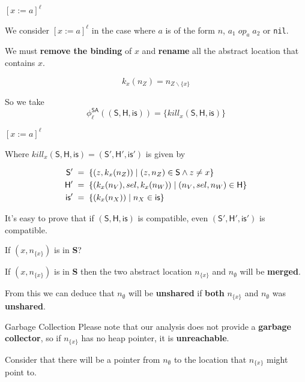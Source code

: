 \documentclass[xcolor=svgnames,11pt]{beamer}
\begin{document}
\begin{frame}{$[x:=a]^\ell$}

\begin{block}{}
We consider $[x:=a]^\ell$ in the case where $a$ is of the form $n$, $a_1 \; op_a \; a_2$ or \texttt{nil}.
\end{block}

\medskip
\pause

We must \textbf{remove the binding} of $x$ and \textbf{rename} all the abstract location that contains $x$.

$$ k_x (n_Z) = n_{Z \backslash \{ x \}} $$

\medskip
\pause

So we take 
$${\phi}_\ell^{\mathsf{SA}}\mathsf{((S,H,is))} = \{ kill_x \mathsf{ (S,H,is) } \} $$

\end{frame}

\begin{frame}{$[x:=a]^\ell$}

Where $kill_x \mathsf{ (S,H,is) } = \mathsf{(S', H', is')}$ is given by

\begin{align*}
\mathsf{S'} \; &= \; \{ (z, k_x(n_Z) )\;|\; (z, n_Z) \in \mathsf{S} \wedge z \neq x \} \\
\medskip
\mathsf{H'} \; &= \; \{ (k_x(n_V), sel, k_x(n_W)) \;|\; (n_V, sel, n_W) \in \mathsf{H} \} \\
\medskip
\mathsf{is'} \; &= \; \{ (k_x(n_X) )\;|\; n_X \in \mathsf{is} \}
\end{align*}

\medskip
\pause

It's easy to prove that if $\mathsf{(S,H,is)}$ is compatible, even $\mathsf{(S',H',is')}$ is compatible.

\end{frame}

\begin{frame}{If $(x, n_{ \{ x \} })$ is in \textbf{S}?}

If $(x, n_{ \{ x \} })$ is in \textbf{S} then the two abstract location $n_{\{x\}}$ and $n_\emptyset$ will be \textbf{merged}.

\medskip
\pause

From this we can deduce that $n_\emptyset$ will be \textbf{unshared} if \textbf{both} $n_{ \{ x \} }$ and $n_\emptyset$ was \textbf{unshared}.

\medskip
\pause

\begin{block}{Garbage Collection}
Please note that our analysis does not provide a \textbf{garbage collector}, so if $n_{ \{ x \} }$ has no heap pointer, it is \textbf{unreachable}.

Consider that there will be a pointer from $n_\emptyset$ to the location that $n_{ \{ x \} }$ might point to.  

\end{block}
\end{frame}
\end{document}
